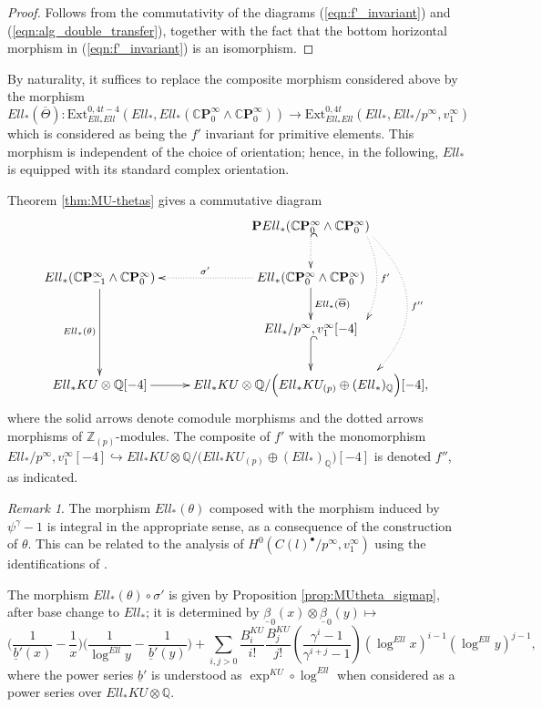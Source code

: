 \documentclass[10pt,a4paper]{amsart}
\theoremstyle{definition}
\theoremstyle{remark}
\newtheorem{rem}[thm]{Remark}
\newcommand{\prim}{\mathbf{P}}
\newcommand{\ext}{\mathrm{Ext}}
\newcommand{\zed}{\mathbb{Z}}
\newcommand{\rat}{\mathbb{Q}}
\newcommand{\plocal}{\zed_{(p)}}
\newcommand{\tmf}{{Ell}}
\newcommand{\tmfcoeff}{{Ell}}
\newcommand{\cp}{\mathbb{C} \mathbf{P}^\infty}
\renewcommand{\smash}{\wedge}
\begin{document}
\begin{proof}
	Follows from the commutativity of the diagrams  (\ref{eqn:f'_invariant}) and (\ref{eqn:alg_double_transfer}), together with the fact that the bottom horizontal morphism in  (\ref{eqn:f'_invariant})  is an isomorphism.
\end{proof}

By naturality, it suffices to replace the composite morphism considered above by the morphism
\[
\tmfcoeff_* (\overline{\Theta}) :
\ext_{\tmfcoeff_*\tmfcoeff}^{0,4t -4} (\tmfcoeff_* , \tmfcoeff_* (\cp_0\smash \cp_0) )
\rightarrow
\ext_{\tmfcoeff_*\tmfcoeff}^{0,4t} (\tmfcoeff_* , \tmfcoeff_* /p^\infty,v_1^\infty )
\]
which is considered as being the $f'$ invariant for primitive elements. This morphism is independent of the choice of orientation; hence, in the following, $\tmfcoeff_*$ is equipped with its standard complex orientation.

Theorem \ref{thm:MU-thetas} gives a commutative
diagram
\[
\xymatrix{
&
\prim \tmfcoeff_*(\cp_0 \smash \cp_0)
\ar@{^(.>}[d]
\ar@/^1pc/@<4em>@{.>}[dd]^{f'}
\ar@/^3pc/@<4em>@{.>}[ddd]^{f''}
\\
\tmfcoeff_* (\cp_{-1} \smash \cp_0)
\ar[dd]_{\tmfcoeff_* (\theta)}
&
\tmfcoeff_* (\cp_0 \smash \cp_0)
\ar@{.>}[l]_{\sigma'}
\ar[d]^{\tmfcoeff_*(\overline{\Theta})}
\\
&
\tmfcoeff_* /p^\infty, v_1 ^\infty [-4]
\ar@{^(->}[d]
\\
\tmfcoeff_*KU \otimes \rat[-4]
\ar[r]
&
\tmfcoeff_* KU \otimes \rat/\Big(\tmfcoeff_*KU _{(p)} \oplus (\tmfcoeff_*)_\rat \Big) [-4],
}
\]
where the solid arrows denote comodule morphisms and the dotted arrows morphisms of
$\plocal$-modules. The composite of $f'$ with the monomorphism $\tmfcoeff_* /p^\infty, v_1 ^\infty [-4]
\hookrightarrow \tmfcoeff_* KU \otimes \rat/\Big(\tmfcoeff_*KU _{(p)} \oplus (\tmfcoeff_*)_\rat \Big) [-4]$ is denoted $f''$, as indicated.

\begin{rem}
	The morphism $\tmfcoeff_* (\theta)$ composed with the morphism induced by $\psi^\gamma - 1$ is integral in the appropriate sense, as a consequence of the construction of $\theta$. This can be related to the analysis of $H^0 (C(l)^\bullet/ p^\infty, v_1^\infty) $ using the identifications of \cite[Proposition 6.1]{behrens}.
\end{rem}




The morphism $\tmfcoeff_*(\theta) \circ \sigma'$ is given by Proposition
\ref{prop:MUtheta_sigmap}, after base change  to $\tmfcoeff_*$; it is determined by $
 \underline{\beta}_0 (x) \otimes \underline{\beta}_0 (y)
\mapsto $
\[
\Big( \frac{1}{\underline{b}'(x) } - \frac{1}{x}\Big)
\Big(\frac{1}{\log^{\tmf} y} - \frac{1}{\underline{b}' (y) }\Big)
+
\sum _{i, j >0}\frac{B_i^{KU}}{i!}\frac{B_j^{KU}}{j!}
\left(
\frac{\gamma^i -1}{\gamma^{i+j}-1}
\right)
(\log^\tmf x)^{i-1}(\log ^\tmf y) ^{j-1},
\]
where the power series $\underline{b}'$ is understood as $\exp^{KU} \circ
\log^\tmf$ when considered as a power series over $\tmfcoeff_* KU  \otimes \rat$.
\end{document}
